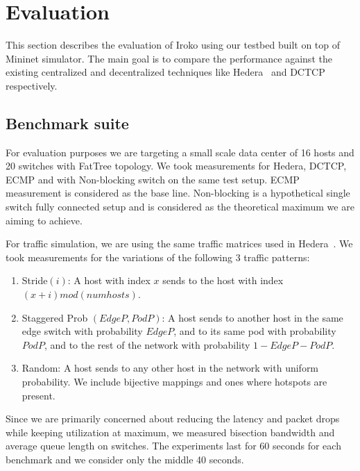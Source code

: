
\section{Evaluation} \label{sec:evaluation}

This section describes the evaluation of Iroko using our testbed built on top of
Mininet simulator. The main goal is to compare the performance against the
existing centralized and decentralized techniques like Hedera~\cite{hedera} and
DCTCP~\cite{dctcp} respectively.

\subsection{Benchmark suite}

For evaluation purposes we are targeting a small scale data center of 16 hosts
and 20 switches with FatTree topology. We took measurements for Hedera, DCTCP,
ECMP and with Non-blocking switch on the same test setup. ECMP measurement is
considered as the base line. Non-blocking is a hypothetical single switch fully
connected setup and is considered as the theoretical maximum we are aiming to
achieve.

For traffic simulation, we are using the same traffic matrices used in
Hedera~\cite{hedera}. We took measurements for the variations of the following 3
traffic patterns:

\begin{enumerate} \item Stride$\left(i\right)$: A host with index $x$ sends to
the host with index $(x + i)mod(num hosts)$.  \item Staggered Prob $\left(EdgeP,
PodP\right)$: A host sends to another host in the same edge switch with
probability $EdgeP$, and to its same pod with probability $PodP$, and to the
rest of the network with probability $1-EdgeP - PodP$.  \item Random: A host
sends to any other host in the	network with uniform probability. We include
bijective mappings and ones where hotspots are present.  \end{enumerate}

Since we are primarily concerned about reducing the latency and packet drops
while keeping utilization at maximum, we measured bisection bandwidth and
    average queue length on switches. The experiments last for 60 seconds for
    each benchmark and we consider only the middle 40 seconds.

